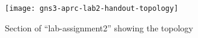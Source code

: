 \begin{figure}
  \centering
  \texttt{[image: gns3-aprc-lab2-handout-topology]}
  \caption{Section of ``lab-assignment2'' showing the topology}
  \label{fig:gns3-aprc-lab2-handout-topology}
\end{figure}
